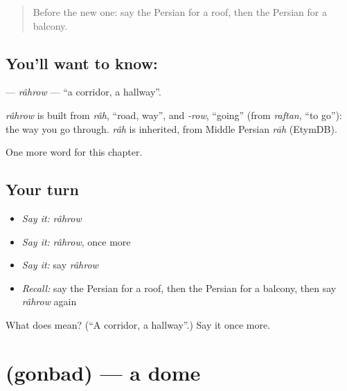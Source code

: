 \label{lesson:FA-C195-rahrow}



\begin{quote}
Before the new one: say the Persian for a roof, then the Persian for a balcony.
\end{quote}

\subsection*{You'll want to know: }
\textbf{} — \emph{râhrow} — \textquotedblleft{}a corridor, a hallway\textquotedblright{}.

\begin{cousinweb}
\emph{râhrow} is built from \emph{râh}, \textquotedblleft{}road, way\textquotedblright{}, and \emph{-row}, \textquotedblleft{}going\textquotedblright{} (from \emph{raftan}, \textquotedblleft{}to go\textquotedblright{}): the way you go through. \emph{râh} is inherited, from Middle Persian \emph{rāh} (EtymDB).
\end{cousinweb}

\begin{grammarlens}[title={What you've built}]
One more word for this chapter.
\end{grammarlens}

\subsection*{Your turn}
\begin{itemize}
\raggedright
  \item \emph{Say it:} \emph{râhrow}
  \item \emph{Say it:} \emph{râhrow}, once more
  \item \emph{Say it:} say \emph{râhrow}
  \item \emph{Recall:} say the Persian for a roof, then the Persian for a balcony, then say \emph{râhrow} again
\end{itemize}

\begin{tcolorbox}[breakable,colback=teal!4,colframe=teal!35!black,title={Before you move on}]
What does  mean? (\textquotedblleft{}A corridor, a hallway\textquotedblright{}.) Say it once more.
\end{tcolorbox}
\section[\texorpdfstring{\fa{گنبد} (gonbad)}{گنبد (gonbad)}]{ (gonbad) — a dome}

